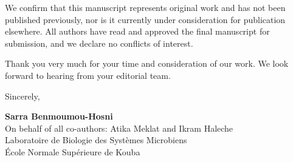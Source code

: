 \documentclass[10pt]{article}
\begin{document}
We confirm that this manuscript represents original work and has not been published previously, nor is it currently under consideration for publication elsewhere. All authors have read and approved the final manuscript for submission, and we declare no conflicts of interest.

Thank you very much for your time and consideration of our work. We look forward to hearing from your editorial team.

\vspace{0.4cm}

\noindent Sincerely,

\vspace{0.5cm}

\noindent
\textbf{Sarra Benmoumou-Hosni} \\
{\small On behalf of all co-authors: Atika Meklat and Ikram Haleche \\
Laboratoire de Biologie des Systèmes Microbiens \\
École Normale Supérieure de Kouba}
\end{document}
